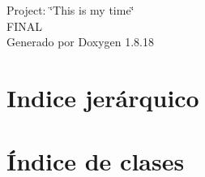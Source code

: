 \let\mypdfximage\pdfximage\def\pdfximage{\immediate\mypdfximage}\documentclass[twoside]{book}
\newcommand{\+}{\discretionary{\mbox{\scriptsize$\hookleftarrow$}}{}{}}
\newcommand{\clearemptydoublepage}{%
  \newpage{\pagestyle{empty}\cleardoublepage}%
}
\begin{document}
\hypersetup{pageanchor=false,
             bookmarksnumbered=true,
             pdfencoding=unicode
            }
\begin{titlepage}
\vspace*{7cm}
\begin{center}%
{\Large Project\+: \char`\"{}\+This is my time\char`\"{} \\[1ex]\large F\+I\+N\+AL }\\
\vspace*{1cm}
{\large Generado por Doxygen 1.8.18}\\
\end{center}
\end{titlepage}
\clearemptydoublepage
{}
\tableofcontents
\clearemptydoublepage
{}
\hypersetup{pageanchor=true}

\chapter{Indice jerárquico}

\chapter{Índice de clases}

\end{document}
